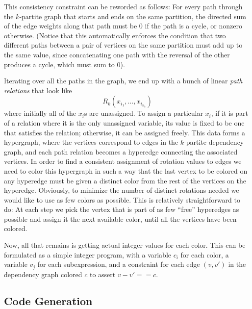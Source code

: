 This consistency constraint can be reworded as follows: For every path through the $k$-partite graph that starts and ends on the same partition, the directed sum of the edge weights along that path must be 0 if the path is a cycle, or nonzero otherwise.
(Notice that this automatically enforces the condition that two different paths between a pair of vertices on the same partition must add up to the same value, since concatenating one path with the reversal of the other produces a cycle, which must sum to 0).

Iterating over all the paths in the graph, we end up with a bunch of linear {\em path relations} that look like $$R_k(x_{i_1}, \dots, x_{i_{n_k}})$$ where initially all of the $x_i$s are unassigned.
To assign a particular $x_i$, if it is part of a relation where it is the only unassigned variable, its value is fixed to be one that satisfies the relation; otherwise, it can be assigned freely.
This data forms a hypergraph, where the vertices correspond to edges in the $k$-partite dependency graph, and each path relation becomes a hyperedge connecting the associated vertices.
In order to find a consistent assignment of rotation values to edges we need to color this hypergraph in such a way that the last vertex to be colored on any hyperedge must be given a distinct color from the rest of the vertices on the hyperedge.
Obviously, to minimize the number of distinct rotations needed we would like to use as few colors as possible.
This is relatively straightforward to do: At each step we pick the vertex that is part of as few ``free'' hyperedges as possible and assign it the next available color, until all the vertices have been colored.

Now, all that remains is getting actual integer values for each color. 
This can be formulated as a simple integer program, with a variable $c_i$ for each color, a variable  $v_j$ for each subexpression, and a constraint for each edge $(v, v')$ in the dependency graph colored $c$ to assert $v - v' == c$.

\subsection{Code Generation}
